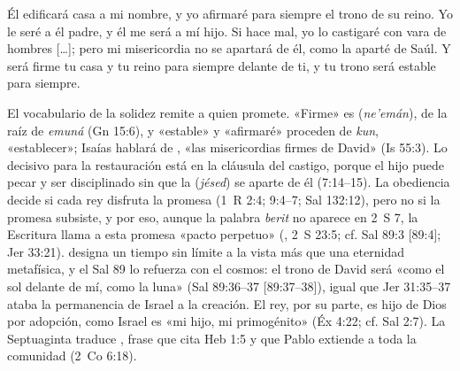 \begin{cita}Él edificará casa a mi nombre, y yo afirmaré para siempre el trono de su reino. Yo le seré a él padre, y él me será a mí hijo. Si hace mal, yo lo castigaré con vara de hombres [\ldots]; pero mi misericordia no se apartará de él, como la aparté de Saúl. Y será firme tu casa y tu reino para siempre delante de ti, y tu trono será estable para siempre.\end{cita}

El vocabulario de la solidez remite a quien promete. «Firme» es  (\emph{ne'emán}), de la raíz de \emph{emuná} (Gn 15:6), y «estable» y «afirmaré» proceden de \emph{kun}, «establecer»; Isaías hablará de , «las misericordias firmes de David» (Is 55:3). Lo decisivo para la restauración está en la cláusula del castigo, porque el hijo puede pecar y ser disciplinado sin que la  (\emph{jésed}) se aparte de él (7:14--15). La obediencia decide si cada rey disfruta la promesa (1~R 2:4; 9:4--7; Sal 132:12), pero no si la promesa subsiste, y por eso, aunque la palabra \emph{berit} no aparece en 2~S 7, la Escritura llama a esta promesa «pacto perpetuo» (, 2~S 23:5; cf. Sal 89:3 [89:4]; Jer 33:21).  designa un tiempo sin límite a la vista más que una eternidad metafísica, y el Sal 89 lo refuerza con el cosmos: el trono de David será «como el sol delante de mí, como la luna» (Sal 89:36--37 [89:37--38]), igual que Jer 31:35--37 ataba la permanencia de Israel a la creación. El rey, por su parte, es hijo de Dios por adopción, como Israel es «mi hijo, mi primogénito» (Éx 4:22; cf. Sal 2:7). La Septuaginta traduce , frase que cita Heb 1:5 y que Pablo extiende a toda la comunidad (2~Co 6:18).

